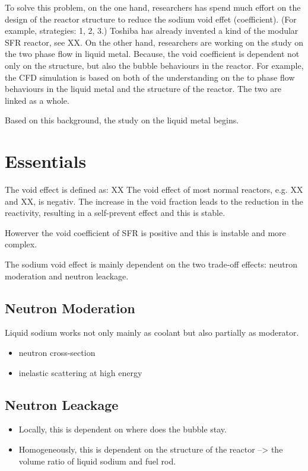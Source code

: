 \documentclass{article}
\begin{document}
To solve this problem, on the one hand, researchers has spend much effort on the design of the reactor structure to reduce the sodium void effet (coefficient). (For example, strategies: 1, 2, 3.) Toshiba has already invented a kind of the modular SFR reactor, see XX. On the other hand, researchers are working on the study on the two phase flow in liquid metal. Because, the void coefficient is dependent not only on the structure, but also the bubble behaviours in the reactor. For example, the CFD simulation is based on both of the understanding on the to phase flow behaviours in the liquid metal and the structure of the reactor. The two are linked as a whole.

Based on this background, the study on the liquid metal begins.

\section{Essentials}
\label{sec:orge39d6c3}
The void effect is defined as:
                    XX
The void effect of most normal reactors, e.g. XX and XX, is negativ. The increase in the void fraction leads to the reduction in the reactivity, resulting in a self-prevent effect and this is stable.

Howerver the void coefficient of SFR is positive and this is instable and more complex.

The sodium void effect is mainly dependent on the two trade-off effects: neutron moderation and neutron leackage.

\subsection{Neutron Moderation}
\label{sec:org81febf3}
Liquid sodium works not only mainly as coolant but also partially as moderator.
\begin{itemize}
\item neutron cross-section
\item inelastic scattering at high energy
\end{itemize}
\subsection{Neutron Leackage}
\label{sec:org3dd6e58}
\begin{itemize}
\item Locally, this is dependent on where does the bubble stay.
\item Homogeneously, this is dependent on the structure of the reactor --> the volume ratio of liquid sodium and fuel rod.
\end{itemize}
\end{document}
